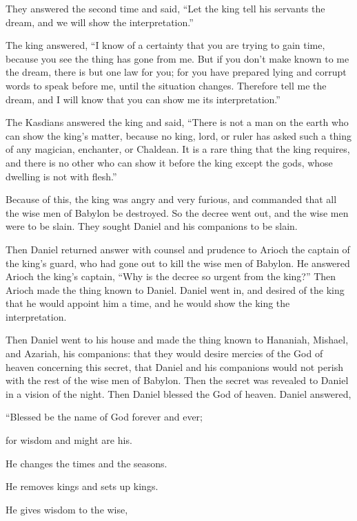 \myverse{}They answered the second time and said, “Let the king tell his servants the dream, and we will show the interpretation.”


\myverse{}The king answered, “I know of a certainty that you are trying to gain time, because you see the thing has gone from me. \myverse{}But if you don’t make known to me the dream, there is but one law for you; for you have prepared lying and corrupt words to speak before me, until the situation changes. Therefore tell me the dream, and I will know that you can show me its interpretation.”

\myverse{}The Kasdians answered the king and said, “There is not a man on the earth who can show the king’s matter, because no king, lord, or ruler has asked such a thing of any magician, enchanter, or Chaldean. \myverse{}It is a rare thing that the king requires, and there is no other who can show it before the king except the gods, whose dwelling is not with flesh.”

\myverse{}Because of this, the king was angry and very furious, and commanded that all the wise men of Babylon be destroyed. \myverse{}So the decree went out, and the wise men were to be slain. They sought Daniel and his companions to be slain.


\myverse{}Then Daniel returned answer with counsel and prudence to Arioch the captain of the king’s guard, who had gone out to kill the wise men of Babylon. \myverse{}He answered Arioch the king’s captain, “Why is the decree so urgent from the king?” Then Arioch made the thing known to Daniel. \myverse{}Daniel went in, and desired of the king that he would appoint him a time, and he would show the king the interpretation.


\myverse{}Then Daniel went to his house and made the thing known to Hananiah, Mishael, and Azariah, his companions: \myverse{}that they would desire mercies of the God of heaven concerning this secret, that Daniel and his companions would not perish with the rest of the wise men of Babylon. \myverse{}Then the secret was revealed to Daniel in a vision of the night. Then Daniel blessed the God of heaven. \myverse{}Daniel answered,

“Blessed be the name of God forever and ever;

for wisdom and might are his.


\myverse{}He changes the times and the seasons.

He removes kings and sets up kings.

He gives wisdom to the wise,

